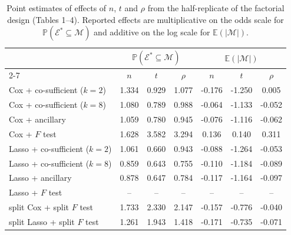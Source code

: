 \documentclass[10pt, reqno]{amsart}
\numberwithin{equation}{section}
\begin{document}
\begin{table}
	\caption{Point estimates of effects of $n$, $t$ and $\rho$ from the half-replicate of the factorial design (Tables 1--4). Reported effects are multiplicative on the odds scale for $\mathbb{P}(\mathcal E^*\subseteq \mathcal{M})$ and additive on the log scale for $\mathbb E(\vert \mathcal{M} \vert)$.}
	{  
		\begin{tabular}{|l|c|c|c|c|c|c|}
			\hline
			\multirow{2}{*}{}     
			& \multicolumn{3}{|c|}{$\mathbb{P}(\mathcal E^*\subseteq \mathcal{M})$} 
			& \multicolumn{3}{|c|}{$\mathbb E(\vert \mathcal{M} \vert)$} \\
			\cline{2-7}
			& $n$ & $t$ & $\rho$ & $n$ & $t$ & $\rho$ \\
			\hline
			Cox + co-sufficient ($k = 2$) & 1.334 & 0.929 & 1.077 & -0.176 & -1.250 & 0.005 \\
			Cox + co-sufficient ($k = 8$) & 1.080 & 0.789 & 0.988 & -0.064 & -1.133 & -0.052 \\
			Cox + ancillary & 1.059 & 0.780 & 0.945 & -0.076 & -1.116 & -0.062 \\
			Cox + $F$ test & 1.628 & 3.582 & 3.294 & 0.136 & 0.140 & 0.311 \\
			Lasso + co-sufficient ($k = 2$) & 1.061 & 0.660 & 0.943 & -0.088 & -1.264 & -0.053 \\
			Lasso + co-sufficient ($k = 8$) & 0.859 & 0.643 & 0.755 & -0.110 & -1.184 & -0.089 \\
			Lasso + ancillary & 0.878 & 0.647 & 0.784 & -0.117 & -1.164 & -0.097 \\
			Lasso + $F$ test & -- & -- & -- & -- & -- & -- \\
			split Cox + split $F$ test & 1.733 & 2.330 & 2.147 & -0.157 & -0.776 & -0.040 \\
			split Lasso + split $F$ test & 1.261 & 1.943 & 1.418 & -0.171 & -0.735 & -0.071 \\
			\hline
		\end{tabular}
		\label{tab6}
	}
\end{table}
\end{document}
